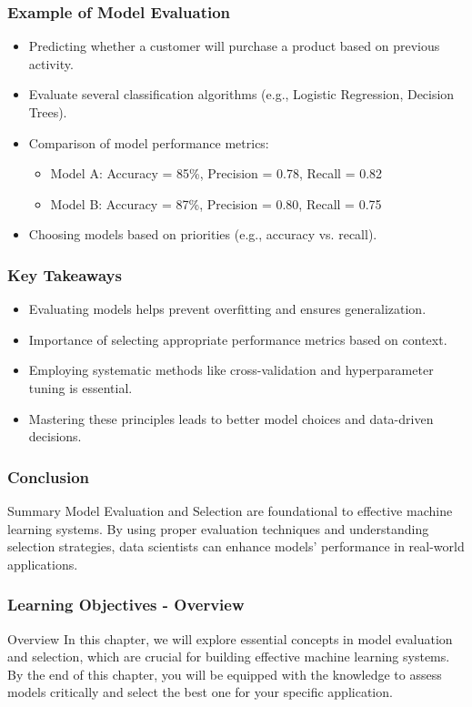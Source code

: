 \documentclass{beamer}
\begin{document}
\begin{frame}[fragile]
    \frametitle{Example of Model Evaluation}
    \begin{itemize}
        \item Predicting whether a customer will purchase a product based on previous activity.
        \item Evaluate several classification algorithms (e.g., Logistic Regression, Decision Trees).
        \item Comparison of model performance metrics:
            \begin{itemize}
                \item Model A: Accuracy = 85\%, Precision = 0.78, Recall = 0.82
                \item Model B: Accuracy = 87\%, Precision = 0.80, Recall = 0.75
            \end{itemize}
        \item Choosing models based on priorities (e.g., accuracy vs. recall).
    \end{itemize}
\end{frame}

\begin{frame}[fragile]
    \frametitle{Key Takeaways}
    \begin{itemize}
        \item Evaluating models helps prevent overfitting and ensures generalization.
        \item Importance of selecting appropriate performance metrics based on context.
        \item Employing systematic methods like cross-validation and hyperparameter tuning is essential.
        \item Mastering these principles leads to better model choices and data-driven decisions.
    \end{itemize}
\end{frame}

\begin{frame}[fragile]
    \frametitle{Conclusion}
    \begin{block}{Summary}
        Model Evaluation and Selection are foundational to effective machine learning systems. By using proper evaluation techniques and understanding selection strategies, data scientists can enhance models' performance in real-world applications.
    \end{block}
\end{frame}

\begin{frame}[fragile]
    \frametitle{Learning Objectives - Overview}
    \begin{block}{Overview}
        In this chapter, we will explore essential concepts in model evaluation and selection, which are crucial for building effective machine learning systems. 
        By the end of this chapter, you will be equipped with the knowledge to assess models critically and select the best one for your specific application.
    \end{block}
\end{frame}
\end{document}
